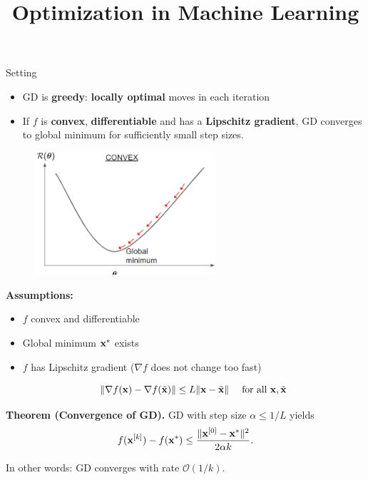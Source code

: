 \documentclass[11pt,compress,t,notes=noshow, xcolor=table]{beamer}
\title{Optimization in Machine Learning}
\date{}
\begin{document}
\sloppy
	
\begin{vbframe}{Setting}

\begin{itemize}
    \setlength{\itemsep}{1em}
    \item GD is \textbf{greedy}: \textbf{locally optimal} moves in each iteration
    \item If $f$ is \textbf{convex}, \textbf{differentiable} and has a \textbf{Lipschitz gradient}, GD converges to global minimum for sufficiently small step sizes.
\end{itemize}

\medskip

\begin{figure}
    \centering
    \includegraphics[width=0.6\textwidth]{figure_man/gdes_1.png}
\end{figure}

\framebreak

\textbf{Assumptions:}
\begin{itemize}
    \item $f$ convex and differentiable
    \item Global minimum $\mathbf{x}^\ast$ exists
    \item $f$ has Lipschitz gradient ($\nabla f$ does not change too fast)
        \begin{framed}
            \begin{equation*}
               \| \nabla f(\mathbf{x}) - \nabla f(\tilde{\mathbf{x}}) \| \le L \|\mathbf{x} - \tilde{\mathbf{x}}\| \quad \text{ for all $\mathbf{x}, \tilde{\mathbf{x}}$}
            \end{equation*}
        \end{framed}
\end{itemize}
        
\begin{framed}
    \textbf{Theorem \textnormal{(Convergence of GD)}.}
    GD with step size $\alpha \leq 1/L$ yields
    \begin{equation*}
        f(\mathbf{x}^{[k]}) - f(\mathbf{x}^\ast) \leq \frac{\| \mathbf{x}^{[0]} - \mathbf{x}^\ast \|^2}{2\alpha k}.
    \end{equation*}
    
    In other words: GD converges with rate $\mathcal{O}(1/k)$.
\end{framed}

\end{vbframe}
\end{document}
